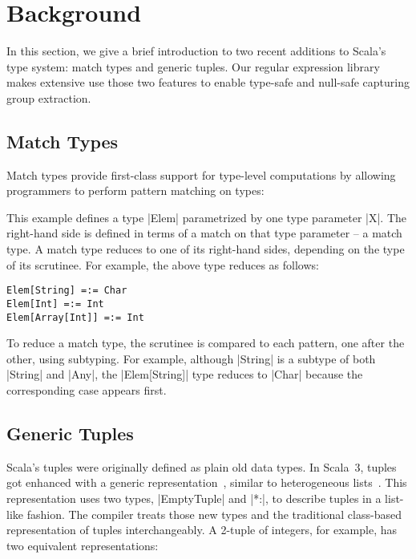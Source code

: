 
\section{Background}
\label{sec:background}

In this section, we give a brief introduction to two recent additions to Scala's type system: match types and generic tuples.
Our regular expression library makes extensive use those two features to enable type-safe and null-safe capturing group extraction.

\subsection{Match Types}

Match types provide first-class support for type-level computations by allowing programmers to perform pattern matching on types:

\elemExample

\noindent
This example defines a type |Elem| parametrized by one type parameter |X|.
The right-hand side is defined in terms of a match on that type parameter -- a match type.
A match type reduces to one of its right-hand sides, depending on the type of its scrutinee.
For example, the above type reduces as follows:

\begin{lstlisting}
Elem[String] =:= Char
Elem[Int] =:= Int
Elem[Array[Int]] =:= Int
\end{lstlisting}

\noindent
To reduce a match type, the scrutinee is compared to each pattern, one after the other, using subtyping.
For example, although |String| is a subtype of both |String| and |Any|, the |Elem[String]| type reduces to |Char| because the corresponding case appears first.

\subsection{Generic Tuples}
\label{subsec:generic-tuples}

Scala's tuples were originally defined as plain old data types.
In Scala~3, tuples got enhanced with a generic representation~\citep{bazzucchi2021tuples}, similar to heterogeneous lists~\citep{kiselyov2004strongly}.
This representation uses two types, |EmptyTuple| and |*:|, to describe tuples in a list-like fashion.
The compiler treats those new types and the traditional class-based representation of tuples interchangeably.
A 2-tuple of integers, for example, has two equivalent representations:

